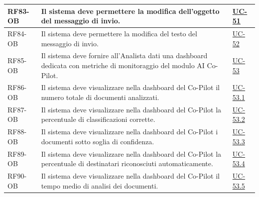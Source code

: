 ﻿\documentclass[a4paper,12pt]{article}
\begin{document}
\begin{description}[style=multiline, leftmargin=4cm, font=\bfseries]
\begin{enumerate}[leftmargin=*, nosep]
{\begin{longtable}{|p{2.5cm}|p{9.5cm}|p{3.5cm}|}
    \hline
    RF83-OB & Il sistema deve permettere la modifica dell'oggetto del messaggio di invio. & \hyperref[fig:uc-51]{UC-51} \\
    \hline
    RF84-OB & Il sistema deve permettere la modifica del testo del messaggio di invio. & \hyperref[fig:uc-52]{UC-52} \\
    \hline
    RF85-OB & Il sistema deve fornire all'Analista dati una dashboard dedicata con metriche di monitoraggio del modulo AI Co-Pilot. & \hyperref[fig:uc-53]{UC-53} \\
    \hline
    RF86-OB & Il sistema deve visualizzare nella dashboard del Co-Pilot il numero totale di documenti analizzati. & \hyperref[fig:uc-53.1]{UC-53.1} \\
    \hline
    RF87-OB & Il sistema deve visualizzare nella dashboard del Co-Pilot la percentuale di classificazioni corrette. & \hyperref[fig:uc-53.2]{UC-53.2} \\
    \hline
    RF88-OB & Il sistema deve visualizzare nella dashboard del Co-Pilot i documenti sotto soglia di confidenza. & \hyperref[fig:uc-53.3]{UC-53.3} \\
    \hline
    RF89-OB & Il sistema deve visualizzare nella dashboard del Co-Pilot la percentuale di destinatari riconosciuti automaticamente. & \hyperref[fig:uc-53.4]{UC-53.4} \\
    \hline
    RF90-OB & Il sistema deve visualizzare nella dashboard del Co-Pilot il tempo medio di analisi dei documenti. & \hyperref[fig:uc-53.5]{UC-53.5} \\
    \hline


\end{longtable}}
\end{enumerate}
\end{description}
\end{document}
